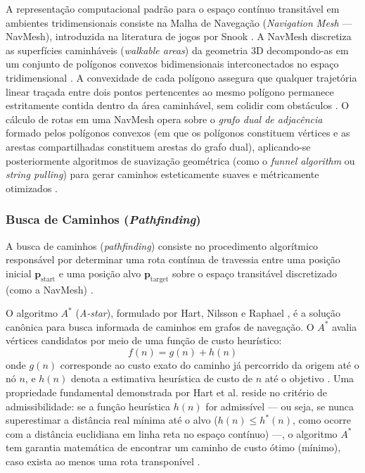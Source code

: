 A representação computacional padrão para o espaço contínuo transitável em ambientes tridimensionais consiste na Malha de Navegação (\textit{Navigation Mesh} --- NavMesh), introduzida na literatura de jogos por Snook \cite{snook2000simplified}. A NavMesh discretiza as superfícies caminháveis (\textit{walkable areas}) da geometria 3D decompondo-as em um conjunto de polígonos convexos bidimensionais interconectados no espaço tridimensional \cite{snook2000simplified, regmi2025system}. A convexidade de cada polígono assegura que qualquer trajetória linear traçada entre dois pontos pertencentes ao mesmo polígono permanece estritamente contida dentro da área caminhável, sem colidir com obstáculos \cite{snook2000simplified}. O cálculo de rotas em uma NavMesh opera sobre o \textit{grafo dual de adjacência} formado pelos polígonos convexos (em que os polígonos constituem vértices e as arestas compartilhadas constituem arestas do grafo dual), aplicando-se posteriormente algoritmos de suavização geométrica (como o \textit{funnel algorithm} ou \textit{string pulling}) para gerar caminhos esteticamente suaves e métricamente otimizados \cite{snook2000simplified, xu2025databasedrivenframework3dlevel}.

\subsubsection{Busca de Caminhos (\textit{Pathfinding})}
\label{sec:pathfinding}

A busca de caminhos (\textit{pathfinding}) consiste no procedimento algorítmico responsável por determinar uma rota contínua de travessia entre uma posição inicial $\mathbf{p}_{\text{start}}$ e uma posição alvo $\mathbf{p}_{\text{target}}$ sobre o espaço transitável discretizado (como a NavMesh) \cite{hart1968formal, snook2000simplified, sun2024roomplanner, xu2025databasedrivenframework3dlevel}.

O algoritmo $A^*$ (\textit{A-star}), formulado por Hart, Nilsson e Raphael \cite{hart1968formal}, é a solução canônica para busca informada de caminhos em grafos de navegação. O $A^*$ avalia vértices candidatos por meio de uma função de custo heurístico:
\begin{equation}
    f(n) = g(n) + h(n)
\end{equation}
onde $g(n)$ corresponde ao custo exato do caminho já percorrido da origem até o nó $n$, e $h(n)$ denota a estimativa heurística de custo de $n$ até o objetivo \cite{hart1968formal}. Uma propriedade fundamental demonstrada por Hart et al. \cite{hart1968formal} reside no critério de admissibilidade: se a função heurística $h(n)$ for admissível --- ou seja, se nunca superestimar a distância real mínima até o alvo ($h(n) \le h^*(n)$, como ocorre com a distância euclidiana em linha reta no espaço contínuo) ---, o algoritmo $A^*$ tem garantia matemática de encontrar um caminho de custo ótimo (mínimo), caso exista ao menos uma rota transponível \cite{hart1968formal}.

